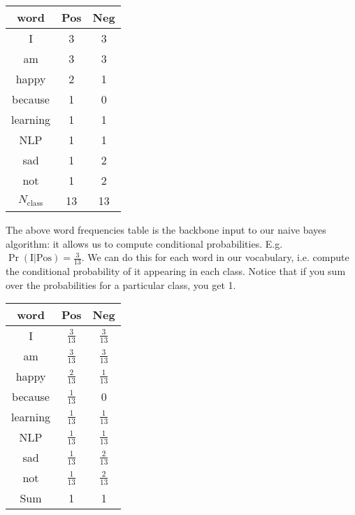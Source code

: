 \documentclass[12pt]{article}
\begin{document}
\begin{minipage}{1.0\textwidth}
  \begin{multicols}{2}
    \begin{center}
\end{center}
\vfill\null \columnbreak
\begin{tabular}{c c c}
  \hline
  word & {\color{green!50!black} Pos} & {\color{purple!90} Neg} \\
  \hline
  I & 3 & 3 \\
  am & 3 & 3 \\
  happy & 2 & 1 \\
  because & 1 & 0 \\
  learning & 1 & 1 \\
  NLP & 1 & 1 \\
  sad & 1 & 2 \\
  not & 1 & 2 \\
  \hline
  $N_{\textrm{class}}$ & 13 & 13
\end{tabular}
\end{multicols}
\end{minipage}

The above word frequencies table is the backbone input to our naive bayes algorithm: it allows us to compute conditional probabilities. E.g. $\Pr(\textrm{I} | \textrm{Pos}) = \frac{3}{13}$. We can do this for each word in our vocabulary, i.e. compute the conditional probability of it appearing in each class. Notice that if you sum over the probabilities for a particular class, you get 1.

\begin{center}
\begin{tabular}{c c c}
  \hline
  word & {\color{green!50!black} Pos} & {\color{purple!90} Neg} \\
  \hline
  I & $\frac{3}{13}$ & $\frac{3}{13}$ \\
  am & $\frac{3}{13}$ & $\frac{3}{13}$ \\
  {\color{green!50!black} happy} & $\frac{2}{13}$ & $\frac{1}{13}$ \\
  because & $\frac{1}{13}$ & 0 \\
  learning & $\frac{1}{13}$ & $\frac{1}{13}$ \\
  NLP & $\frac{1}{13}$ & $\frac{1}{13}$ \\
  {\color{purple!90}sad} & $\frac{1}{13}$ & $\frac{2}{13}$ \\
  {\color{purple!90}not} & $\frac{1}{13}$ & $\frac{2}{13}$ \\
  \hline
  Sum & 1 & 1
\end{tabular}
\end{center}
\end{document}

